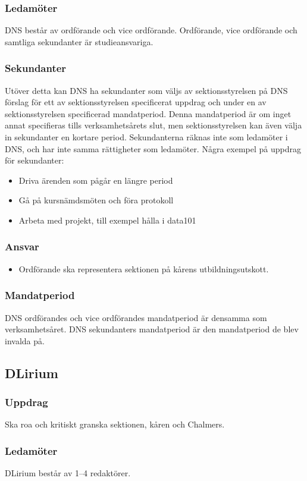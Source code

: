 \subsubsection{Ledamöter}
DNS består av ordförande och vice ordförande. 
Ordförande, vice ordförande och samtliga sekundanter är studieansvariga.
\subsubsection{Sekundanter}
Utöver detta kan DNS ha sekundanter som väljs av sektionsstyrelsen på DNS förslag för ett av sektionsstyrelsen specificerat uppdrag och under en av sektionsstyrelsen specificerad mandatperiod.
Denna mandatperiod är om inget annat specifieras tills verksamhetsårets slut, men sektionsstyrelsen kan även välja in sekundanter en kortare period.
Sekundanterna räknas inte som ledamöter i DNS, och har inte samma rättigheter som ledamöter.
Några exempel på uppdrag för sekundanter:
\begin{itemize}
  \item Driva ärenden som pågår en längre period
  \item Gå på kursnämdsmöten och föra protokoll
  \item Arbeta med projekt, till exempel hålla i data101
\end{itemize}
\subsubsection{Ansvar}
\begin{itemize}
  \item Ordförande ska representera sektionen på kårens utbildningsutskott.
\end{itemize}
\subsubsection{Mandatperiod}
DNS ordförandes och vice ordförandes mandatperiod är densamma som verksamhetsåret. DNS sekundanters mandatperiod är den mandatperiod de blev invalda på.

\subsection{DLirium}
\subsubsection{Uppdrag}
Ska roa och kritiskt granska sektionen, kåren och Chalmers. 
\subsubsection{Ledamöter}
DLirium består av 1--4 redaktörer.
